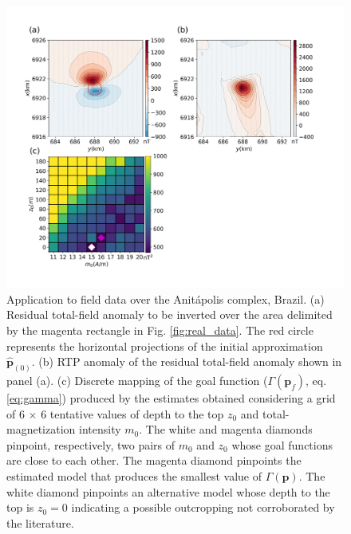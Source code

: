 \begin{figure}
    \centering
    \includegraphics[width=\linewidth]{figures/anitapolis_rtp.png}
    \caption{Application to field data over the Anit{\'a}polis complex, Brazil. (a) Residual total-field anomaly to be inverted over the area delimited by the  magenta rectangle in Fig. \ref{fig:real_data}. The red circle represents the horizontal projections 	of the initial approximation 
    $\hat{\mathbf{p}}_{(0)}$.
    (b) RTP anomaly of the  residual total-field anomaly shown in panel (a). 
(c) Discrete mapping of the goal function ($ \Gamma(\mathbf{p}_f)$, eq. \ref{eq:gamma}) produced by the estimates  obtained considering a grid of 6 $\times$ 6 tentative values of 
	   depth to the top $z_0$ and total-magnetization intensity $m_0$. 
	   The white and magenta diamonds pinpoint, respectively, two pairs of $m_0$  and $z_0$
	   whose goal functions are close to each other. The magenta diamond pinpoints the estimated model that produces the smallest value of $\Gamma(\mathbf{p})$.
The white diamond pinpoints an alternative model whose depth to the top is $z_0=0$ indicating a possible outcropping not corroborated by the literature.	 
}
    \label{fig:anitapolis_rtp}
\end{figure}



